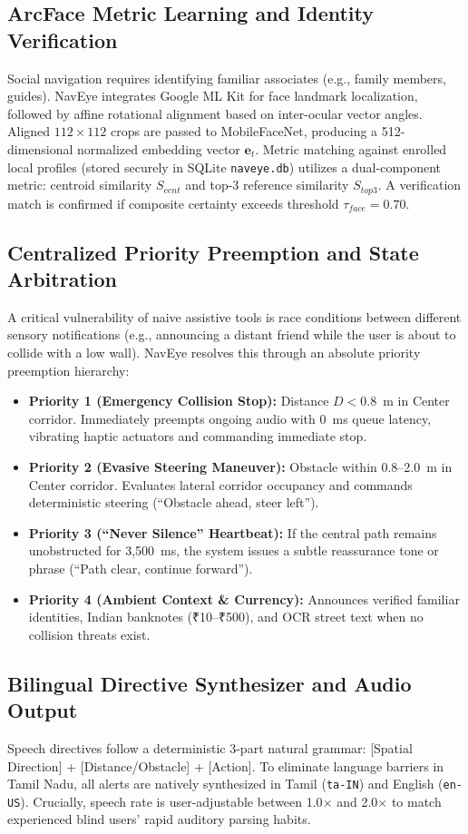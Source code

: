 \documentclass[conference]{IEEEtran}
\begin{document}
\subsection{ArcFace Metric Learning and Identity Verification}
Social navigation requires identifying familiar associates (e.g., family members, guides). NavEye integrates Google ML Kit for face landmark localization, followed by affine rotational alignment based on inter-ocular vector angles. Aligned $112 \times 112$ crops are passed to MobileFaceNet, producing a 512-dimensional normalized embedding vector $\mathbf{e}_t$. Metric matching against enrolled local profiles (stored securely in SQLite \texttt{naveye.db}) utilizes a dual-component metric: centroid similarity $S_{cent}$ and top-3 reference similarity $S_{top3}$. A verification match is confirmed if composite certainty exceeds threshold $\tau_{face} = 0.70$.

\subsection{Centralized Priority Preemption and State Arbitration}
A critical vulnerability of naive assistive tools is race conditions between different sensory notifications (e.g., announcing a distant friend while the user is about to collide with a low wall). NavEye resolves this through an absolute priority preemption hierarchy:
\begin{itemize}
    \item \textbf{Priority 1 (Emergency Collision Stop):} Distance $D < 0.8$~m in Center corridor. Immediately preempts ongoing audio with 0~ms queue latency, vibrating haptic actuators and commanding immediate stop.
    \item \textbf{Priority 2 (Evasive Steering Maneuver):} Obstacle within 0.8--2.0~m in Center corridor. Evaluates lateral corridor occupancy and commands deterministic steering (``Obstacle ahead, steer left'').
    \item \textbf{Priority 3 (``Never Silence'' Heartbeat):} If the central path remains unobstructed for 3,500~ms, the system issues a subtle reassurance tone or phrase (``Path clear, continue forward'').
    \item \textbf{Priority 4 (Ambient Context \& Currency):} Announces verified familiar identities, Indian banknotes (₹10--₹500), and OCR street text when no collision threats exist.
\end{itemize}

\subsection{Bilingual Directive Synthesizer and Audio Output}
Speech directives follow a deterministic 3-part natural grammar: [Spatial Direction] + [Distance/Obstacle] + [Action]. To eliminate language barriers in Tamil Nadu, all alerts are natively synthesized in Tamil (\texttt{ta-IN}) and English (\texttt{en-US}). Crucially, speech rate is user-adjustable between 1.0$\times$ and 2.0$\times$ to match experienced blind users' rapid auditory parsing habits.
\end{document}
